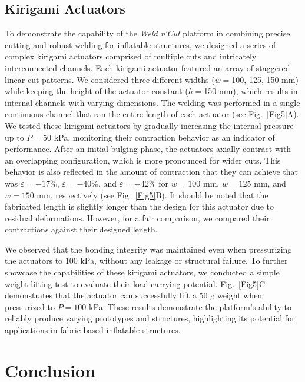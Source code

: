 \documentclass[journal, letterpaper]{IEEEtran}
\begin{document}
\subsection{Kirigami Actuators}
To demonstrate the capability of the \textit{Weld n'Cut} platform in combining precise cutting and robust welding for inflatable structures, we designed a series of complex kirigami actuators comprised of multiple cuts and intricately interconnected channels. Each kirigami actuator featured an array of staggered linear cut patterns.
We considered three different widths ($w=$100, 125, 150 mm) while keeping the height of the actuator constant ($h=$150 mm), which results in internal channels with varying dimensions. The welding was performed in a single continuous channel that ran the entire length of each actuator (see Fig.~\ref{Fig5}A).
We tested these kirigami actuators by gradually increasing the internal pressure up to $P=50$ kPa, monitoring their contraction behavior as an indicator of performance. 
After an initial bulging phase, the actuators axially contract with an overlapping configuration, which is more pronounced for wider cuts. 
This behavior is also reflected in the amount of contraction that they can achieve that was $\varepsilon=-17\%$, $\varepsilon=-40\%$, and $\varepsilon=-42\%$ for $w=100$ mm, $w=125$ mm, and $w=150$ mm, respectively (see Fig.~\ref{Fig5}B). It should be noted that the fabricated length is slightly longer than the design for this actuator due to residual deformations. However, for a fair comparison, we compared their contractions against their designed length. 

We observed that the bonding integrity was maintained even when pressurizing the actuators to 100 kPa, without any leakage or structural failure. To further showcase the capabilities of these kirigami actuators, we conducted a simple weight-lifting test to evaluate their load-carrying potential.
Fig.~\ref{Fig5}C demonstrates that the actuator can successfully lift a 50 g weight when pressurized to $P=100$ kPa. These results demonstrate the platform's ability to reliably produce varying prototypes and structures, highlighting its potential for applications in fabric-based inflatable structures.



\section{Conclusion}
\end{document}
